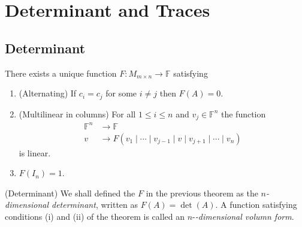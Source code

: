 \documentclass{article}
\newcommand{\F}{\mathbb{F}}
\begin{document}
\section{Determinant and Traces}
\subsection{Determinant}
\begin{theorem}
	There exists a unique function $ F:M_{m\times n}\to \F $ satisfying
	\begin{enumerate}
		\item (Alternating) If $ c_i=c_j $ for some $ i\ne j $ then $ F(A)=0 $.
		\item (Multilinear in columns) For all $ 1\le i\le n $ and $ v_j\in \F^n $ the function 
			\begin{align*}
				\F^n&\to \F\\
				v&\to F(v_1\mid \cdots \mid v_{j-1} \mid v \mid v_{j+1} \mid \cdots \mid v_n )
			\end{align*}
			is linear.
		\item $ F(I_n)=1 $.
	\end{enumerate}
\end{theorem}
\begin{definition}
	(Determinant) We shall defined the $ F $ in the previous theorem as the $ n $\textit{-dimensional determinant}, written as $ F(A)=\det(A) $. A function satisfying conditions (i) and (ii) of the theorem is called an $ n $-\textit{-dimensional volumn form}.
\end{definition}
\end{document}

